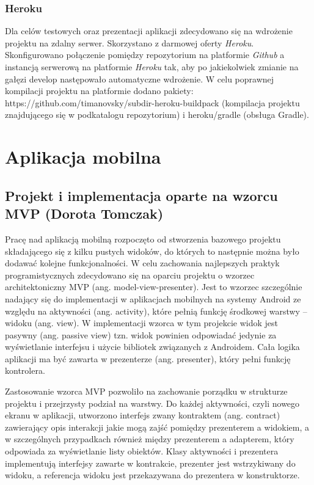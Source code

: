 \documentclass[10pt,twoside,a4paper]{report}
\begin{document}
\subsection{Heroku}
\par Dla celów testowych oraz prezentacji aplikacji zdecydowano się na wdrożenie projektu na zdalny serwer. Skorzystano z darmowej oferty \textit{Heroku}. Skonfigurowano połączenie pomiędzy repozytorium na platformie \textit{Github} a instancją serwerową na platformie \textit{Heroku} tak, aby po jakiekolwiek zmianie na gałęzi develop następowało automatyczne wdrożenie. W celu poprawnej kompilacji projektu na platformie dodano pakiety: https://github.com/timanovsky/subdir-heroku-buildpack (kompilacja projektu znajdującego się w podkatalogu repozytorium) i heroku/gradle (obsługa Gradle).

\chapter{Aplikacja mobilna}

\section{Projekt i implementacja oparte na wzorcu MVP (Dorota Tomczak)}
\par Pracę nad aplikacją mobilną rozpoczęto od stworzenia bazowego projektu składającego się z kilku pustych widoków, do których to następnie można było dodawać kolejne funkcjonalności. W celu zachowania najlepszych praktyk programistycznych zdecydowano się na oparciu projektu o wzorzec architektoniczny MVP (ang. model-view-presenter). Jest to wzorzec szczególnie nadający się do implementacji w aplikacjach mobilnych na systemy Android ze względu na aktywności (ang. activity), które pełnią funkcję środkowej warstwy – widoku (ang. view). W implementacji wzorca w tym projekcie widok jest pasywny (ang. passive view) tzn. widok powinien odpowiadać jedynie za wyświetlanie interfejsu i użycie bibliotek związanych z Androidem. Cała logika aplikacji ma być zawarta w prezenterze (ang. presenter), który pełni funkcję kontrolera.

\par Zastosowanie wzorca MVP pozwoliło na zachowanie porządku w strukturze projektu i przejrzysty podział na warstwy. Do każdej aktywności, czyli nowego ekranu w aplikacji, utworzono interfejs zwany kontraktem (ang. contract) zawierający opis interakcji jakie mogą zajść pomiędzy prezenterem a widokiem, a w szczególnych przypadkach również między prezenterem a adapterem, który odpowiada za wyświetlanie listy obiektów. Klasy aktywności i prezentera implementują interfejsy zawarte w kontrakcie, prezenter jest wstrzykiwany do widoku, a referencja widoku jest przekazywana do prezentera w konstruktorze.
\end{document}
